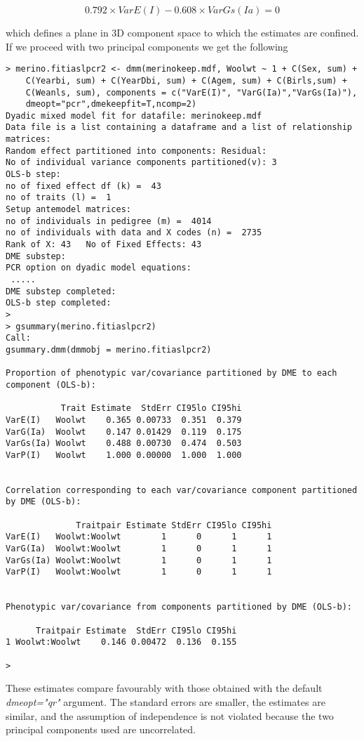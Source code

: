 \documentclass[titlepage]{article}  %
\begin{document}
\begin{displaymath}
0.792 \times VarE(I) - 0.608 \times VarGs(Ia) = 0
\end{displaymath}

which defines a plane in 3D component space to which the estimates are confined.
If we proceed with two principal components we get the following

\begin{verbatim}
> merino.fitiaslpcr2 <- dmm(merinokeep.mdf, Woolwt ~ 1 + C(Sex, sum) +
    C(Yearbi, sum) + C(YearDbi, sum) + C(Agem, sum) + C(Birls,sum) +
    C(Weanls, sum), components = c("VarE(I)", "VarG(Ia)","VarGs(Ia)"),
    dmeopt="pcr",dmekeepfit=T,ncomp=2)
Dyadic mixed model fit for datafile: merinokeep.mdf  
Data file is a list containing a dataframe and a list of relationship matrices:
Random effect partitioned into components: Residual:
No of individual variance components partitioned(v): 3 
OLS-b step:
no of fixed effect df (k) =  43 
no of traits (l) =  1 
Setup antemodel matrices:
no of individuals in pedigree (m) =  4014 
no of individuals with data and X codes (n) =  2735 
Rank of X: 43   No of Fixed Effects: 43 
DME substep:
PCR option on dyadic model equations:
 .....
DME substep completed:
OLS-b step completed:
>
> gsummary(merino.fitiaslpcr2)
Call:
gsummary.dmm(dmmobj = merino.fitiaslpcr2)

Proportion of phenotypic var/covariance partitioned by DME to each component (OLS-b):

           Trait Estimate  StdErr CI95lo CI95hi
VarE(I)   Woolwt    0.365 0.00733  0.351  0.379
VarG(Ia)  Woolwt    0.147 0.01429  0.119  0.175
VarGs(Ia) Woolwt    0.488 0.00730  0.474  0.503
VarP(I)   Woolwt    1.000 0.00000  1.000  1.000


Correlation corresponding to each var/covariance component partitioned by DME (OLS-b):

              Traitpair Estimate StdErr CI95lo CI95hi
VarE(I)   Woolwt:Woolwt        1      0      1      1
VarG(Ia)  Woolwt:Woolwt        1      0      1      1
VarGs(Ia) Woolwt:Woolwt        1      0      1      1
VarP(I)   Woolwt:Woolwt        1      0      1      1


Phenotypic var/covariance from components partitioned by DME (OLS-b):

      Traitpair Estimate  StdErr CI95lo CI95hi
1 Woolwt:Woolwt    0.146 0.00472  0.136  0.155

> 
\end{verbatim}

These estimates compare favourably with those obtained with the default {\em dmeopt="qr"} argument. The standard errors are smaller, the estimates are similar, and the assumption of independence is not violated because the two principal components used are uncorrelated.
\end{document}
